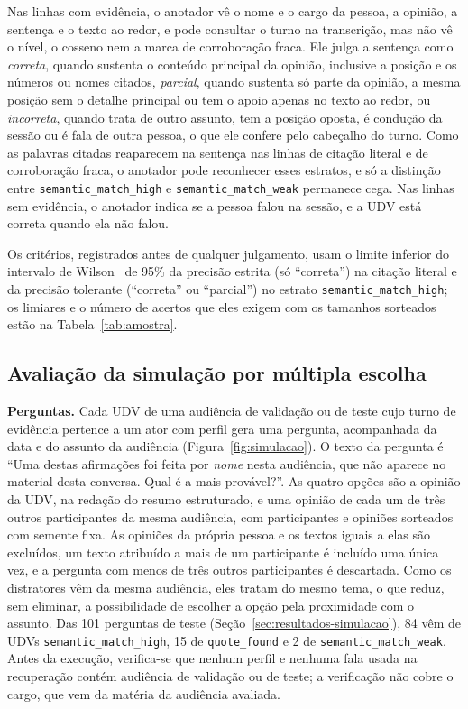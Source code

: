 Nas linhas com evidência, o anotador vê o nome e o cargo da pessoa, a opinião, a sentença e o texto ao
redor, e pode consultar o turno na transcrição, mas não vê o nível, o cosseno nem a marca de
corroboração fraca. Ele julga a sentença como \emph{correta}, quando sustenta o conteúdo principal da
opinião, inclusive a posição e os números ou nomes citados, \emph{parcial}, quando sustenta só parte da
opinião, a mesma posição sem o detalhe principal ou tem o apoio apenas no texto ao redor, ou
\emph{incorreta}, quando trata de outro assunto, tem a posição oposta, é condução da sessão ou é fala
de outra pessoa, o que ele confere pelo cabeçalho do turno. Como as palavras citadas reaparecem na
sentença nas linhas de citação literal e de corroboração fraca, o anotador pode reconhecer esses
estratos, e só a distinção entre \texttt{semantic\_match\_high} e \texttt{semantic\_match\_weak}
permanece cega. Nas linhas sem evidência, o anotador indica se a pessoa falou na sessão, e a UDV está
correta quando ela não falou.

Os critérios, registrados antes de qualquer julgamento, usam o limite inferior do intervalo de
Wilson~\citep{wilson1927probable} de 95\% da precisão estrita (só ``correta'') na citação literal e da
precisão tolerante (``correta'' ou ``parcial'') no estrato \texttt{semantic\_match\_high}; os limiares
e o número de acertos que eles exigem com os tamanhos sorteados estão na Tabela~\ref{tab:amostra}.

\subsection{Avaliação da simulação por múltipla escolha}
\label{sec:setup-simulacao}



\textbf{Perguntas.} Cada UDV de uma audiência de validação ou de teste cujo turno de evidência
pertence a um ator com perfil gera uma pergunta, acompanhada da data e do assunto da audiência
(Figura~\ref{fig:simulacao}). O texto da pergunta é ``Uma destas afirmações foi feita por
\textit{nome} nesta audiência, que não aparece no material desta conversa. Qual é a mais provável?''.
As quatro opções são a opinião da UDV, na redação do resumo estruturado, e uma opinião de cada um de
três outros participantes da mesma audiência, com participantes e opiniões sorteados com semente fixa.
As opiniões da própria pessoa e os textos iguais a elas são excluídos, um texto atribuído a mais de um
participante é incluído uma única vez, e a pergunta com menos de três outros participantes é
descartada. Como os distratores vêm da mesma audiência, eles tratam do mesmo tema, o que reduz, sem
eliminar, a possibilidade de escolher a opção pela proximidade com o assunto. Das 101 perguntas de
teste (Seção~\ref{sec:resultados-simulacao}), 84 vêm de UDVs \texttt{semantic\_match\_high}, 15 de
\texttt{quote\_found} e 2 de \texttt{semantic\_match\_weak}. Antes da execução, verifica-se que
nenhum perfil e nenhuma fala usada na recuperação contém audiência de validação ou de teste; a
verificação não cobre o cargo, que vem da matéria da audiência avaliada.

